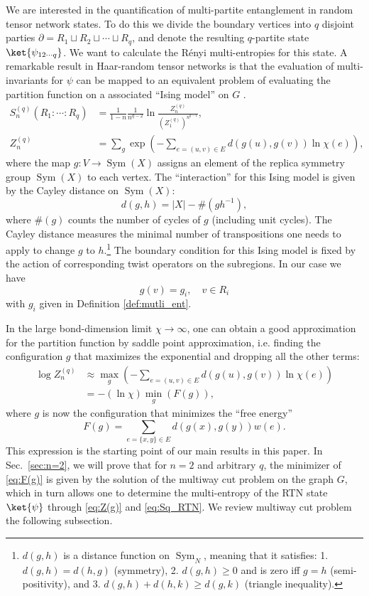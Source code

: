 \documentclass[11pt,oneside,letterpaper]{article}
\numberwithin{equation}{section}
\theoremstyle{definition}
\theoremstyle{remark}
\DeclareMathOperator{\Sym}{Sym}
\begin{document}
We are interested in the quantification of multi-partite entanglement in random tensor network states. To do this we divide the boundary vertices into $q$ disjoint parties $\partial = R_1 \sqcup R_2 \sqcup \cdots \sqcup R_q$, and denote the resulting $q$-partite state $\ket{\psi_{12\cdots q}}$. We want to calculate the R\'enyi multi-entropies for this state. A remarkable result in Haar-random tensor networks is that the evaluation of multi-invariants for $\psi$ can be mapped to an equivalent problem of evaluating the partition function on a associated ``Ising model'' on $G$ \cite{Hayden:2016cfa}.
\begin{align}
\label{eq:Sq_RTN}
  S^{(q)}_n(R_1:\cdots:R_q) &= \frac{1}{1-n}\frac{1}{n^{q-2}}\ln \frac{Z^{(q)}_n}{(Z^{(q)}_1)^{n^{q-1}}},\\
  Z^{(q)}_n &= \sum_{g} \exp\left(-\sum_{e=(u,v)\in E} d(g(u),g(v))\ln \chi(e)\right),
\end{align}
where the map $g:V\to \Sym(X)$ assigns an element of the replica symmetry group $\Sym(X)$ to each vertex. The ``interaction'' for this Ising model is given by the Cayley distance on $\Sym(X)$:
\begin{equation}
  d(g,h) =  |X| - \#(gh^{-1}),
\end{equation}
where $\#(g)$ counts the number of cycles of $g$ (including unit cycles).
The Cayley distance measures the minimal number of transpositions one needs to apply to change $g$ to $h$.\footnote{$d(g,h)$ is a distance function on $\Sym_N$, meaning that it satisfies: 1. $d(g,h)=d(h,g)$ (symmetry), 2. $d(g,h)\ge0$ and is zero iff $g=h$ (semi-positivity), and 3. $d(g,h)+d(h,k)\ge d(g,k)$ (triangle inequality).} The boundary condition for this Ising model is fixed by the action of corresponding twist operators on the subregions. In our case we have
\begin{equation}
  g(v) = g_i, \quad v\in R_i
\end{equation}
with $g_i$ given in Definition \ref{def:mutli_ent}.

In the large bond-dimension limit $\chi\to \infty$, one can obtain a good approximation for the partition function by saddle point approximation, i.e. finding the configuration $g$ that maximizes the exponential and dropping all the other terms:
\begin{align}
\label{eq:Z(g)}
  \log Z^{(q)}_n &\approx \max_g\left(-\sum_{e=(u,v)\in E} d(g(u),g(v))\ln \chi(e)\right) \\
  &= -(\ln\chi) \min_g\left(F(g)\right),
\end{align}
where $g$ is now the configuration that minimizes the ``free energy''
\begin{equation}
\label{eq:F(g)}
  F(g) = \sum_{e=\{x,y\}\in E} d(g(x),g(y)) w(e).
\end{equation}
This expression is the starting point of our main results in this paper. In Sec.~\ref{sec:n=2}, we will prove that for $n=2$ and arbitrary $q$, the minimizer of \eqref{eq:F(g)} is given by the solution of the multiway cut problem on the graph $G$, which in turn allows one to determine the multi-entropy of the RTN state $\ket{\psi}$ through \eqref{eq:Z(g)} and \eqref{eq:Sq_RTN}. We review multiway cut problem the following subsection.
\end{document}
